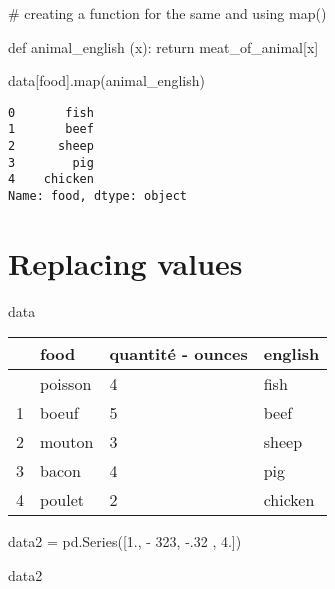 \documentclass[
  letterpaper,
  DIV=11,
  numbers=noendperiod]{scrreprt}
\newenvironment{Shaded}{\begin{snugshade}}{\end{snugshade}}
\newcommand{\BuiltInTok}[1]{\textcolor[rgb]{0.00,0.23,0.31}{#1}}
\newcommand{\CommentTok}[1]{\textcolor[rgb]{0.37,0.37,0.37}{#1}}
\newcommand{\ControlFlowTok}[1]{\textcolor[rgb]{0.00,0.23,0.31}{#1}}
\newcommand{\DecValTok}[1]{\textcolor[rgb]{0.68,0.00,0.00}{#1}}
\newcommand{\FloatTok}[1]{\textcolor[rgb]{0.68,0.00,0.00}{#1}}
\newcommand{\KeywordTok}[1]{\textcolor[rgb]{0.00,0.23,0.31}{#1}}
\newcommand{\NormalTok}[1]{\textcolor[rgb]{0.00,0.23,0.31}{#1}}
\newcommand{\OperatorTok}[1]{\textcolor[rgb]{0.37,0.37,0.37}{#1}}
\newcommand{\StringTok}[1]{\textcolor[rgb]{0.13,0.47,0.30}{#1}}
\begin{document}
\begin{Shaded}
\begin{Highlighting}[]
\CommentTok{\# creating a function for the same and using map() }

\KeywordTok{def}\NormalTok{ animal\_english (x):}
    \ControlFlowTok{return}\NormalTok{ meat\_of\_animal[x]}

\NormalTok{data[}\StringTok{\textquotesingle{}food\textquotesingle{}}\NormalTok{].}\BuiltInTok{map}\NormalTok{(animal\_english)}
\end{Highlighting}
\end{Shaded}

\begin{verbatim}
0       fish
1       beef
2      sheep
3        pig
4    chicken
Name: food, dtype: object
\end{verbatim}

\hypertarget{replacing-values}{%
\section{Replacing values}\label{replacing-values}}

\begin{Shaded}
\begin{Highlighting}[]
\NormalTok{data}
\end{Highlighting}
\end{Shaded}

\begin{longtable}[]{@{}llll@{}}
\toprule\noalign{}
& food & quantité - ounces & english \\
\midrule\noalign{}
\endhead
\bottomrule\noalign{}
\endlastfoot
0 & poisson & 4 & fish \\
1 & boeuf & 5 & beef \\
2 & mouton & 3 & sheep \\
3 & bacon & 4 & pig \\
4 & poulet & 2 & chicken \\
\end{longtable}

\begin{Shaded}
\begin{Highlighting}[]
\NormalTok{data2 }\OperatorTok{=}\NormalTok{ pd.Series([}\FloatTok{1.}\NormalTok{, }\OperatorTok{{-}} \DecValTok{323}\NormalTok{, }\OperatorTok{{-}}\FloatTok{.32}\NormalTok{ , }\FloatTok{4.}\NormalTok{])}

\NormalTok{data2}
\end{Highlighting}
\end{Shaded}
\end{document}

